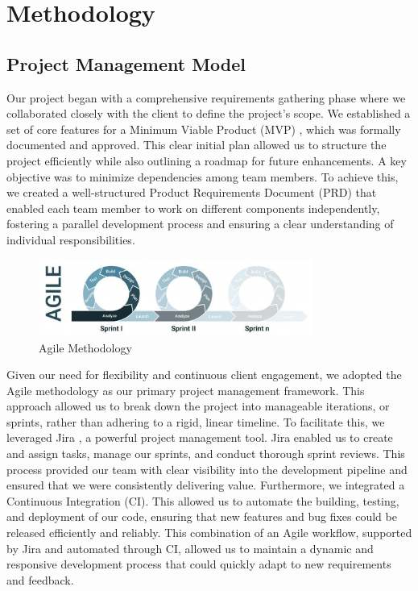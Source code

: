 
\chapter{Methodology}
\section{ Project Management Model}

Our project began with a comprehensive requirements gathering phase where we collaborated closely with the client to define the project's scope. We established a set of core features for a Minimum Viable Product (MVP) \cite{atlassian_mvp}, which was formally documented and approved. This clear initial plan allowed us to structure the project efficiently while also outlining a roadmap for future enhancements. A key objective was to minimize dependencies among team members. To achieve this, we created a well-structured Product Requirements Document (PRD) \cite{atlassian_requirements} that enabled each team member to work on different components independently, fostering a parallel development process and ensuring a clear understanding of individual responsibilities.

\begin{figure}[h]
    \centering
    \includegraphics[width=0.8\textwidth]{agile.jpeg}
    \caption{Agile Methodology}
    \label{fig:agile}
\end{figure}

Given our need for flexibility and continuous client engagement, we adopted the Agile methodology \cite{atlassian_agile} as our primary project management framework. This approach allowed us to break down the project into manageable iterations, or sprints, rather than adhering to a rigid, linear timeline. To facilitate this, we leveraged Jira \cite{atlassian_jira}, a powerful project management tool. Jira enabled us to create and assign tasks, manage our sprints, and conduct thorough sprint reviews. This process provided our team with clear visibility into the development pipeline and ensured that we were consistently delivering value. Furthermore, we integrated a Continuous Integration (CI)\cite{atlassian_ci}. This allowed us to automate the building, testing, and deployment of our code, ensuring that new features and bug fixes could be released efficiently and reliably. This combination of an Agile workflow, supported by Jira and automated through CI, allowed us to maintain a dynamic and responsive development process that could quickly adapt to new requirements and feedback.

